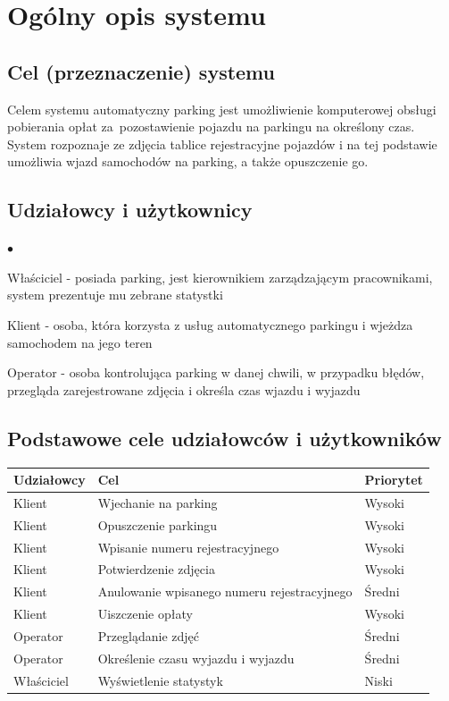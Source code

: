 \chapter{Ogólny opis systemu}
\label{cha:wprowadzenie}


\section{Cel (przeznaczenie) systemu}
\label{sec:celePracy}

Celem systemu automatyczny parking jest umożliwienie komputerowej obsługi pobierania opłat za~pozostawienie pojazdu na parkingu na określony czas. System rozpoznaje ze zdjęcia tablice rejestracyjne pojazdów i na tej podstawie umożliwia wjazd samochodów na parking, a także opuszczenie go.

\section{Udziałowcy i użytkownicy}

\begin{list}{$\bullet$}{}
\item Właściciel - posiada parking, jest kierownikiem zarządzającym pracownikami, system prezentuje mu zebrane statystki
\item Klient - osoba, która korzysta z usług automatycznego parkingu i wjeżdza samochodem na jego teren
\item Operator - osoba kontrolująca parking w danej chwili, w przypadku błędów, przegląda zarejestrowane zdjęcia i określa czas wjazdu i wyjazdu

\end{list}

\section{Podstawowe cele udziałowców i użytkowników}

\begin{table}[H]
	\begin{tabular}{|l|l|l|} \hline
	\textbf{Udziałowcy}	& \textbf{Cel} & \textbf{Priorytet} \\ \hline%
	Klient	& Wjechanie na parking & Wysoki \\
	Klient	& Opuszczenie parkingu & Wysoki \\
	Klient	& Wpisanie numeru rejestracyjnego & Wysoki \\
	Klient	& Potwierdzenie zdjęcia & Wysoki \\
	Klient	& Anulowanie wpisanego numeru rejestracyjnego & Średni \\
	Klient	& Uiszczenie opłaty & Wysoki \\
	Operator& Przeglądanie zdjęć & Średni \\
	Operator& Określenie czasu wyjazdu i wyjazdu & Średni \\
	Właściciel& Wyświetlenie statystyk & Niski \\ \hline
	\end{tabular}
\end{table}

